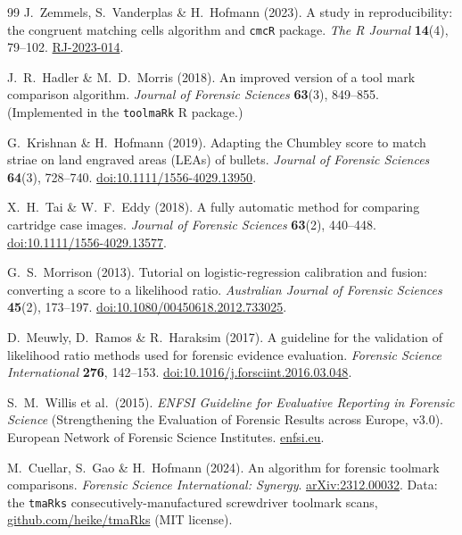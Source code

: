 \documentclass[11pt]{article}
\newcommand{\code}[1]{\texttt{#1}}
\begin{document}
\begin{thebibliography}{99}
 J.~Zemmels, S.~Vanderplas \& H.~Hofmann (2023). A study in
  reproducibility: the congruent matching cells algorithm and \code{cmcR} package.
  \emph{The R Journal} \textbf{14}(4), 79--102.
  \href{https://journal.r-project.org/articles/RJ-2023-014/}{RJ-2023-014}.

 J.~R.~Hadler \& M.~D.~Morris (2018). An improved version of
  a tool mark comparison algorithm. \emph{Journal of Forensic Sciences}
  \textbf{63}(3), 849--855. {\footnotesize (Implemented in the \code{toolmaRk} R
  package.)}

 G.~Krishnan \& H.~Hofmann (2019). Adapting the Chumbley
  score to match striae on land engraved areas (LEAs) of bullets. \emph{Journal of
  Forensic Sciences} \textbf{64}(3), 728--740.
  \href{https://doi.org/10.1111/1556-4029.13950}{doi:10.1111/1556-4029.13950}.

 X.~H.~Tai \& W.~F.~Eddy (2018). A fully automatic method for
  comparing cartridge case images. \emph{Journal of Forensic Sciences}
  \textbf{63}(2), 440--448.
  \href{https://doi.org/10.1111/1556-4029.13577}{doi:10.1111/1556-4029.13577}.

 G.~S.~Morrison (2013). Tutorial on logistic-regression
  calibration and fusion: converting a score to a likelihood ratio.
  \emph{Australian Journal of Forensic Sciences} \textbf{45}(2), 173--197.
  \href{https://doi.org/10.1080/00450618.2012.733025}{doi:10.1080/00450618.2012.733025}.

 D.~Meuwly, D.~Ramos \& R.~Haraksim (2017). A guideline for
  the validation of likelihood ratio methods used for forensic evidence
  evaluation. \emph{Forensic Science International} \textbf{276}, 142--153.
  \href{https://doi.org/10.1016/j.forsciint.2016.03.048}{doi:10.1016/j.forsciint.2016.03.048}.

 S.~M.~Willis et al.\ (2015). \emph{ENFSI Guideline for
  Evaluative Reporting in Forensic Science} (Strengthening the Evaluation of
  Forensic Results across Europe, v3.0). European Network of Forensic Science
  Institutes.
  \href{https://enfsi.eu/wp-content/uploads/2016/09/m1_guideline.pdf}{enfsi.eu}.

 M.~Cuellar, S.~Gao \& H.~Hofmann (2024). An algorithm for
  forensic toolmark comparisons. \emph{Forensic Science International: Synergy}.
  \href{https://arxiv.org/abs/2312.00032}{arXiv:2312.00032}. Data: the
  \code{tmaRks} consecutively-manufactured screwdriver toolmark scans,
  \href{https://github.com/heike/tmaRks}{github.com/heike/tmaRks} (MIT license).

\end{thebibliography}
\end{document}
